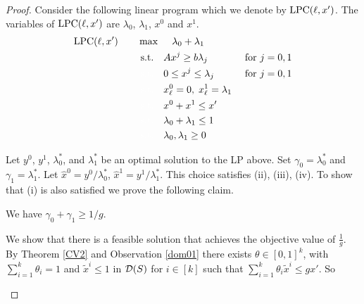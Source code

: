 \begin{proof}	
	Consider the following linear program which we denote by $\operatorname{{{LPC}}}(\ell,x')$. The variables of $\operatorname{{{LPC}}}(\ell,x')$ are $\lambda_0$, $\lambda_1$, $x^0$ and $x^1$.
	\begin{align}
	\LPC(\ell,x')\quad\quad& \max\quad \;\lambda_0+\lambda_1\\
	&\;\text{s.t.} \quad Ax^j \geq b\lambda_j & \mbox{ for $j=0,1$} \label{feasibility}\\
	&\;{\color{white}{\text{s.t.}} }\quad 0 \leq x^j \leq \lambda_j &\mbox{ for $j=0,1$}\label{bound}\\
	&\;{\color{white}{\text{s.t.}} }\quad x^0_\ell = 0,\; x^1_\ell =\lambda_1\label{branchcoordinate}\\
	&\;{\color{white}{\text{s.t.}} }\quad x^0 + x^1 \leq x'\label{packing}\\
		&\;{\color{white}{\text{s.t.}} }\quad \lambda_0 + \lambda_1  \leq 1\label{mulitplier-packing}\\
	&\;{\color{white}{\text{s.t.}} }\quad \lambda_0,\lambda_1 \geq 0
	\end{align}
	
	Let $y^0$, $y^1$, $\lambda^*_0$, and $\lambda^*_1$ be an optimal solution to the LP above. Set $\gamma_0=\lambda^*_0$ and $\gamma_1 = \lambda^*_1$.
Let $\hat{x}^0 = y^0/\lambda^*_0$, $\hat{x}^1=y^1/\lambda^*_1$. This choice satisfies  (ii), (iii), (iv). To show that (i) is also satisfied we prove the following claim.
	\begin{claim}\label{CVexists}
		We have $\gamma_0 + \gamma_1\geq 1/g$.
	\end{claim}
	\begin{cproof}
		We show that there is a feasible solution that achieves the objective value of $\frac{1}{g}$. By Theorem \ref{CV2} and Observation \ref{dom01} there exists $\theta \in [0,1]^k$, with $\sum_{i=1}^{k}\theta_i = 1$ and $\tilde{x}^i\leq 1$ in $\operatorname{\mathcal{D}}(S)$ for $i\in[k]$ such that 
		$\sum_{i=1}^{k}\theta_i \tilde{x}^i\leq gx'$. So
		

\end{cproof}
\end{proof}
